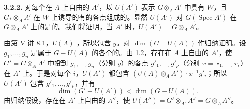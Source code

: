 \textbf{3.2.2.} 对每个在 $A$ 上自由的 $A'$，以 $U(A')$ 表示 $G\otimes_A A'$ 中具有 $W$，且 $G_*\otimes_A A'$ 在 $W$ 上诱导的有的各点组成的。显然 $U(A')$ 对 $G(\operatorname{Spec}A')$ 在 $G\otimes_A A'$ 上的是的。我们将证明，当 $A'$ 时，$U(A')=G\otimes_A A'$。

由第 V 讲 8.1，$U(A)$ ，所以包含 $y$。对 $\dim(G-U(A))$ 作归纳证明。设 $g_1,\ldots,g_n$ 是属于 $G-U(A)$ 的各个的。由 1.2，存在在 $A$ 上自由的 $A'$，使 $G'=G\otimes_A A'$ 中投到 $g_1,\ldots,g_n$（分别 $y$）的各点 $g'_1,\ldots,g'_p$（分别 $x=x_1,\ldots,x_r$）在 $A'$ 上。于是对每个 $i$，$U(A')$ 都包含 $(U(A)\otimes_A A')\cdot x^{-1}g'_i$；所以 $U(A')$ 包含 $g'_1,\ldots,g'_p$，并有
\[
\dim(G'-U(A'))<\dim(G-U(A)).
\]
由归纳假设，存在在 $A'$ 上自由的 $A''$，使 $U(A'')=G'\otimes_{A'}A''=G\otimes_A A''$。

